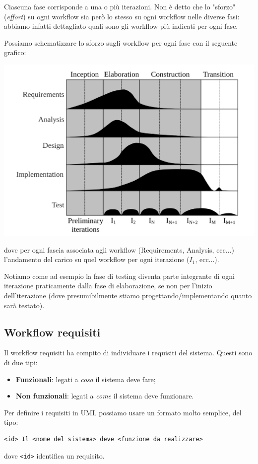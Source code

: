 \documentclass[a4paper,11pt]{article}
\begin{document}
Ciascuna fase corrisponde a una o più iterazioni. Non è detto che lo "sforzo" (\textit{effort}) su ogni workflow sia però lo stesso su ogni workflow nelle diverse fasi: abbiamo infatti dettagliato quali sono gli workflow più indicati per ogni fase.

Possiamo schematizzare lo sforzo sugli workflow per ogni fase con il seguente grafico:
\begin{center}
	\includegraphics[scale=0.4]{../figures/radit_timeline.png}
\end{center}
dove per ogni fascia associata agli workflow (Requirements, Analysis, ecc...) l'andamento del carico su quel workflow per ogni iterazione ($I_1$, ecc...).

Notiamo come ad esempio la fase di testing diventa parte integrante di ogni iterazione praticamente dalla fase di elaborazione, se non per l'inizio dell'iterazione (dove presumibilmente stiamo progettando/implementando quanto sarà testato).

\subsection{Workflow requisiti}
Il workflow requisiti ha compito di individuare i requisiti del sistema.
Questi sono di due tipi:
\begin{itemize}
	\item \textbf{Funzionali}: legati a \textit{cosa} il sistema deve fare;
	\item \textbf{Non funzionali}: legati a \textit{come} il sistema deve funzionare.
\end{itemize}

Per definire i requisiti in UML possiamo usare un formato molto semplice, del tipo:
\begin{lstlisting}[style=codestyle]	
<id> Il <nome del sistema> deve <funzione da realizzare>
\end{lstlisting}
dove \lstinline|<id>| identifica un requisito.
\end{document}
